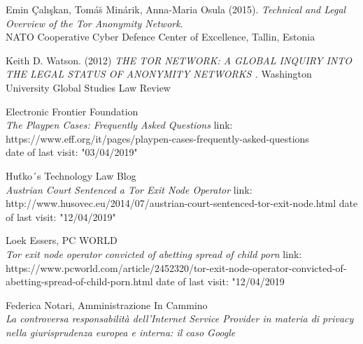 \documentclass[runningheads,a4paper]{llncs}
\begin{document}
\newpage


\begin{thebibliography}{9}

Emin \c{C}alı\c{s}kan, Tom\'{a}\u{s} Min\'{a}rik, Anna-Maria Osula (2015).
\textit{Technical and Legal Overview of the 
Tor Anonymity Network}.\\
NATO Cooperative Cyber Defence Center of 
Excellence, Tallin, Estonia

    Keith D. Watson. (2012)
    \textit{ THE TOR NETWORK: A GLOBAL INQUIRY INTO THE LEGAL STATUS OF ANONYMITY NETWORKS . }
    Washington University Global Studies Law Review

    Electronic Frontier Foundation\\
    \textit{The Playpen Cases: Frequently Asked Questions}
    link: https://www.eff.org/it/pages/playpen-cases-frequently-asked-questions\\
    date of last visit: "03/04/2019"
    
    Huťko´s Technology Law Blog\\
    \textit{Austrian Court Sentenced a Tor Exit Node Operator}
    link:     http://www.husovec.eu/2014/07/austrian-court-sentenced-tor-exit-node.html
    date of last visit: "12/04/2019"
    
    Loek Essers, PC WORLD\\
    \textit{Tor exit node operator convicted of abetting spread of child porn}
    link:         https://www.pcworld.com/article/2452320/tor-exit-node-operator-convicted-of-abetting-spread-of-child-porn.html
    date of last visit: "12/04/2019
    
    Federica Notari, Amministrazione In Cammino\\
    \textit{    La controversa responsabilità dell’Internet Service Provider in materia di privacy nella giurisprudenza europea e interna: il caso Google}



\end{thebibliography}
\end{document}
